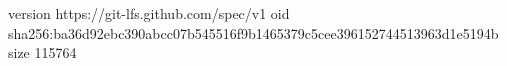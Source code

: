 version https://git-lfs.github.com/spec/v1
oid sha256:ba36d92ebc390abcc07b545516f9b1465379c5cee396152744513963d1e5194b
size 115764
